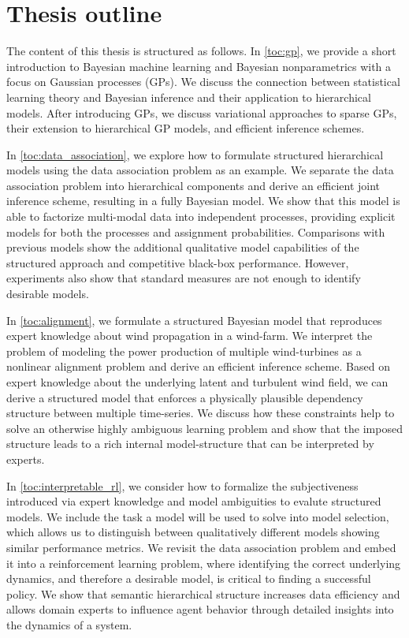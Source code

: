 \section{Thesis outline}
The content of this thesis is structured as follows.
In \cref{toc:gp}, we provide a short introduction to Bayesian machine learning and Bayesian nonparametrics with a focus on Gaussian processes (GPs).
We discuss the connection between statistical learning theory and Bayesian inference and their application to hierarchical models.
After introducing GPs, we discuss variational approaches to sparse GPs, their extension to hierarchical GP models, and efficient inference schemes.

In \cref{toc:data_association}, we explore how to formulate structured hierarchical models using the data association problem as an example.
We separate the data association problem into hierarchical components and derive an efficient joint inference scheme, resulting in a fully Bayesian model.
We show that this model is able to factorize multi-modal data into independent processes, providing explicit models for both the processes and assignment probabilities.
Comparisons with previous models show the additional qualitative model capabilities of the structured approach and competitive black-box performance.
However, experiments also show that standard measures are not enough to identify desirable models.

In \cref{toc:alignment}, we formulate a structured Bayesian model that reproduces expert knowledge about wind propagation in a wind-farm.
We interpret the problem of modeling the power production of multiple wind-turbines as a nonlinear alignment problem and derive an efficient inference scheme.
Based on expert knowledge about the underlying latent and turbulent wind field, we can derive a structured model that enforces a physically plausible dependency structure between multiple time-series.
We discuss how these constraints help to solve an otherwise highly ambiguous learning problem and show that the imposed structure leads to a rich internal model-structure that can be interpreted by experts.

In \cref{toc:interpretable_rl}, we consider how to formalize the subjectiveness introduced via expert knowledge and model ambiguities to evalute structured models.
We include the task a model will be used to solve into model selection, which allows us to distinguish between qualitatively different models showing similar performance metrics.
We revisit the data association problem and embed it into a reinforcement learning problem, where identifying the correct underlying dynamics, and therefore a desirable model, is critical to finding a successful policy.
We show that semantic hierarchical structure increases data efficiency and allows domain experts to influence agent behavior through detailed insights into the dynamics of a system.

